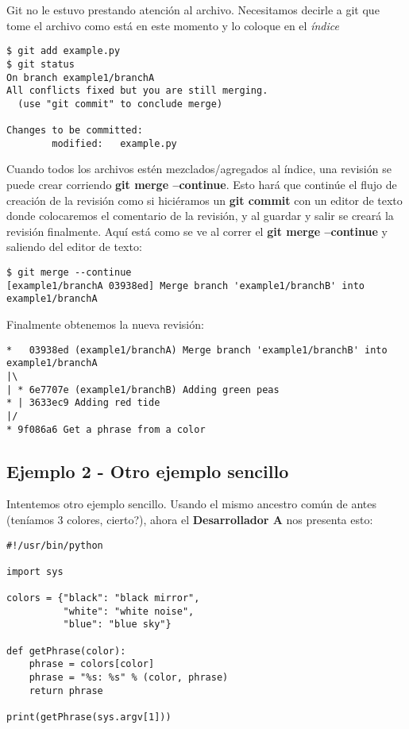 Git no le estuvo prestando atención al archivo. Necesitamos decirle a git que tome el archivo como está en este
momento y lo coloque en el {\it índice}

\begin{lstlisting}[style=console_style, caption={\bf git add; git status}]
$ git add example.py 
$ git status
On branch example1/branchA
All conflicts fixed but you are still merging.
  (use "git commit" to conclude merge)

Changes to be committed:
        modified:   example.py
\end{lstlisting}

Cuando todos los archivos estén mezclados/agregados al índice, una revisión se puede crear corriendo {\bf git merge --continue}.
Esto hará que continúe el flujo de creación de la revisión como si hiciéramos un {\bf git commit} con un editor de texto
donde colocaremos el comentario de la revisión, y al guardar y salir se creará la revisión finalmente. Aquí está como se
ve al correr el {\bf git merge --continue} y saliendo del editor de texto:
\begin{lstlisting}[style=console_style, caption={\bf git merge --continue}]
$ git merge --continue
[example1/branchA 03938ed] Merge branch 'example1/branchB' into example1/branchA
\end{lstlisting}

Finalmente obtenemos la nueva revisión:
\begin{lstlisting}[style=console_style, caption={\bf Ejemplo 1} - historia final de las ramas]
*   03938ed (example1/branchA) Merge branch 'example1/branchB' into example1/branchA
|\  
| * 6e7707e (example1/branchB) Adding green peas
* | 3633ec9 Adding red tide
|/  
* 9f086a6 Get a phrase from a color
\end{lstlisting}


\subsection{Ejemplo 2 - Otro ejemplo sencillo}
\label{example_02}

Intentemos otro ejemplo sencillo. Usando el mismo ancestro común de antes (teníamos 3 colores, cierto?),
ahora el {\bf Desarrollador A} nos presenta esto:
\begin{lstlisting}[style=python_style, caption={\bf Ejemplo 2} - Desarrollador A]
#!/usr/bin/python

import sys

colors = {"black": "black mirror",
          "white": "white noise",
          "blue": "blue sky"}

def getPhrase(color):
    phrase = colors[color]
    phrase = "%s: %s" % (color, phrase)
    return phrase

print(getPhrase(sys.argv[1]))
\end{lstlisting}

